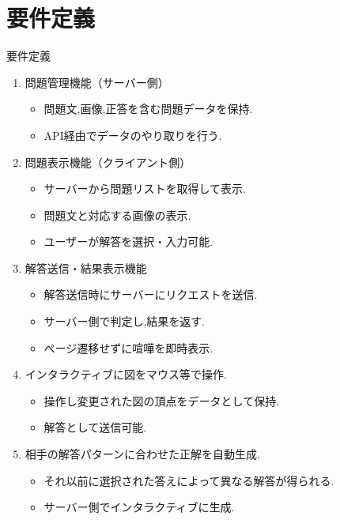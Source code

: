 \documentclass[aspectratio=169]{beamer}
\begin{document}
\section{要件定義}

\begin{frame}[allowframebreaks]{要件定義}
    \begin{enumerate}
        \setlength{\parskip}{1em}
        \item 問題管理機能（サーバー側）
        \begin{itemize}
            \item 問題文,画像,正答を含む問題データを保持.
            \item API経由でデータのやり取りを行う.
        \end{itemize}
        \item 問題表示機能（クライアント側）
        \begin{itemize}
            \item サーバーから問題リストを取得して表示.
            \item 問題文と対応する画像の表示.
            \item ユーザーが解答を選択・入力可能.
        \end{itemize}
        \newpage
        \item 解答送信・結果表示機能
        \begin{itemize}
            \item 解答送信時にサーバーにリクエストを送信.
            \item サーバー側で判定し,結果を返す.
            \item ページ遷移せずに喧嘩を即時表示.
        \end{itemize}
        \item インタラクティブに図をマウス等で操作.
        \begin{itemize}
            \item 操作し変更された図の頂点をデータとして保持.
            \item 解答として送信可能.
        \end{itemize}
        \item 相手の解答パターンに合わせた正解を自動生成.
        \begin{itemize}
            \item それ以前に選択された答えによって異なる解答が得られる.
            \item サーバー側でインタラクティブに生成.
        \end{itemize}
    \end{enumerate}
\end{frame}
\end{document}
